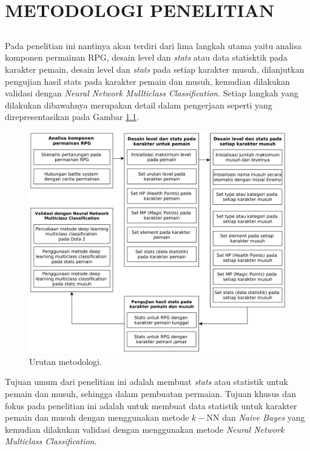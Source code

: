 \chapter{METODOLOGI PENELITIAN}
\label{chap:chap3_metodologi}

\section*{}
Pada penelitian ini nantinya akan terdiri dari lima langkah utama yaitu analisa komponen permainan RPG, desain level dan \textit{stats} atau data statisktik pada karakter pemain, desain level dan \textit{stats} pada setiap karakter musuh, dilanjutkan pengujian hasil stats pada karakter pemain dan musuh, kemudian dilakukan validasi dengan \textit{Neural Network Mullticlass Classification}. Setiap langkah yang dilakukan dibawahnya merupakan detail dalam pengerjaan seperti yang direpresentasikan pada Gambar \ref{fig:metodologi}.
\vspace{1ex}

\begin{figure} [!h] \centering
	\includegraphics[scale=0.115]{img/metodologi_3.png}
	\caption{Urutan metodologi.}
	\label{fig:metodologi}
\end{figure}
\vspace{1ex}

Tujuan umum dari penelitian ini adalah membuat \textit{stats} atau statistik untuk pemain dan musuh, sehingga dalam pembuatan permaian. Tujuan khusus dan fokus pada penelitian ini adalah untuk membuat data statistik untuk karakter pemain dan musuh dengan menggunakan metode $k-$NN dan \textit{Naive Bayes} yang kemudian dilakukan validasi dengan menggunakan metode \textit{Neural Network} \textit{Multiclass Classification}.
\vspace{1ex}

